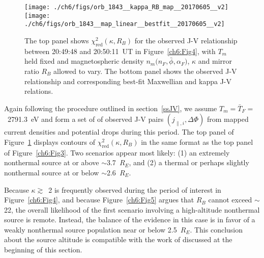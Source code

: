   \begin{figure}
    \centering
    \noindent\texttt{[image: ./ch6/figs/orb\_1843\_\_kappa\_RB\_map\_\_20170605\_\_v2]}
    \noindent\texttt{[image: ./ch6/figs/orb\_1843\_\_map\_linear\_\_bestfit\_\_20170605\_\_v2]}
    \caption[Orbit 1843: Reduced chi-squared values for observed J-V curves and
    corresponding best-fit J-V curves.]{The top panel shows
      $\chi^2_{\mathrm{red}} ( \kappa, R_B)$ for the observed J-V relationship
      between 20:49:48 and 20:50:11~UT in Figure~\ref{ch6:Fig4}, with $T_m$ held
      fixed and magnetospheric density $n_m \big ( n_F, \bar{\phi}, \alpha_F
      \big )$, $\kappa$ and mirror ratio $R_B$ allowed to vary. The bottom panel
      shows the observed J-V relationship and corresponding best-fit Maxwellian
      and kappa J-V relations.}
    \label{ch6:Fig6}
  \end{figure}

  
  Again following the procedure outlined in section~\ref{ssJV}, we assume
  $T_m = \bar{T}_F =$~2791.3~eV and form a set of of observed J-V pairs
  $( j_{\parallel,i} , \Delta \Phi )$ from mapped current densities and
  potential drops during this period. The top panel of Figure~\ref{ch6:Fig6}
  displays contours of $\chi^2_{\textrm{red}} ( \kappa, R_B )$ in the same
  format as the top panel of Figure~\ref{ch6:Fig3}. Two scenarios appear most
  likely: (1) an extremely nonthermal source at or above $\sim$3.7~$R_E$, and
  (2) a thermal or perhaps slightly nonthermal source at or below
  $\sim$2.6~$R_E$. 

  Because $\kappa \gtrsim$~2 is frequently observed during the period of
  interest in Figure~\ref{ch6:Fig4}, and because Figure~\ref{ch6:Fig5} argues
  that $R_B$ cannot exceed $\sim$22, the overall likelihood of the first
  scenario involving a high-altitude nonthermal source is remote. Instead, the
  balance of the evidence in this case is in favor of a weakly nonthermal source
  population near or below 2.5~$R_E$. This conclusion about the source altitude
  is compatible with the work of \citet{Ergun1998} discussed at the beginning of
  this section.
  
